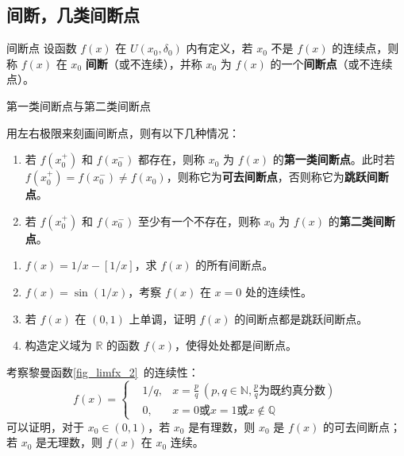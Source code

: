 \subsection{间断，几类间断点}
\begin{definition}{间断点}\label{def_confun_1}
  设函数 $f(x)$ 在 $U(x_0,\delta_0)$ 内有定义，若 $x_0$ 不是 $f(x)$ 的连续点，则称 $f(x)$ 在 $x_0$ \textbf{间断}（或不连续），并称 $x_0$ 为 $f(x)$ 的一个\textbf{间断点}（或不连续点）。
\end{definition}
\begin{definition}{第一类间断点与第二类间断点}

用左右极限来刻画间断点，则有以下几种情况：
\begin{enumerate}
\item 若 $f(x_0^+)$ 和 $f(x_0^-)$ 都存在，则称 $x_0$ 为 $f(x)$ 的\textbf{第一类间断点}。此时若 $f(x_0^+)=f(x_0^-)\neq f(x_0)$，则称它为\textbf{可去间断点}，否则称它为\textbf{跳跃间断点}。
\item 若 $f(x_0^+)$ 和 $f(x_0^-)$ 至少有一个不存在，则称 $x_0$ 为 $f(x)$ 的\textbf{第二类间断点}。
\end{enumerate}
\end{definition}

\begin{exercise}{}
\begin{enumerate}
\item $f(x)=1/x-[1/x]$，求 $f(x)$ 的所有间断点。
\item $f(x)=\sin(1/x)$，考察 $f(x)$ 在 $x=0$ 处的连续性。
\item 若 $f(x)$ 在 $(0,1)$ 上单调，证明 $f(x)$ 的间断点都是跳跃间断点。
\item 构造定义域为 $\mathbb{R}$ 的函数 $f(x)$，使得处处都是间断点。 
\end{enumerate}
\end{exercise}
  
考察黎曼函数\autoref{fig_limfx_2}~的连续性：
\begin{equation}
f(x)=\left\{
\begin{aligned}
&1/q, &x=\frac{p}{q}\ (p,q\in \mathbb{N}, \frac{p}{q}\text{为既约真分数})\\
&0,&x=0\text{或}x=1\text{或} x\notin \mathbb{Q}
\end{aligned} \right.
\end{equation}
可以证明，对于 $x_0\in(0,1)$，若 $x_0$ 是有理数，则 $x_0$ 是 $f(x)$ 的可去间断点；若 $x_0$ 是无理数，则 $f(x)$ 在 $x_0$ 连续。

